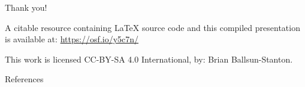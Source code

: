 \documentclass[aspectratio=1610, 11pt]{beamer} %
\begin{document}
\begin{frame}{Thank you!}


A citable resource containing \LaTeX{} source code and this compiled presentation is available at: \url{https://osf.io/y5c7n/}

This work is licensed CC-BY-SA 4.0 International, by: Brian Ballsun-Stanton. 

\end{frame}



\begin{frame}{References}
\printbibliography[heading=none]
\end{frame}
\end{document}
